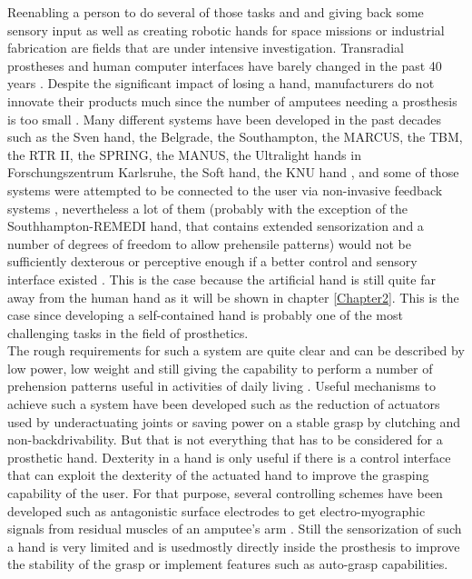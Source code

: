 \documentclass[main]{subfiles}
\begin{document}
Reenabling a person to do several of those tasks and and giving back some sensory input as well as creating robotic hands for space missions or industrial fabrication are fields that are under intensive investigation. Transradial prostheses and human computer interfaces have barely changed in the past 40 years \cite{TheSmartHand2011}. Despite the significant impact of losing a hand, manufacturers do not innovate their products much since the number of amputees needing a prosthesis is too small \cite{DillinghamRecentTrends2002}. Many different systems have been developed in the past decades such as the Sven hand, the Belgrade, the Southampton, the MARCUS, the TBM, the RTR II, the SPRING,
the MANUS, the Ultralight hands in Forschungszentrum Karlsruhe, the Soft hand, the KNU hand \cite{Razic1972,Herberts1973,Light2000,Kyberd1995,Dechev2001,Massa2002,Carrozza2004,Pons2004,Pylatiuk2004,Carrozza2005,Chu2008}, and some of those systems were attempted to be connected to the user via non-invasive feedback systems \cite{Kyberd1993,Pons2005,Pylatiuk2004}, nevertheless a lot of them (probably with the exception of the Southhampton-REMEDI hand, that contains extended sensorization and a number of degrees of freedom to allow prehensile patterns) would not be sufficiently dexterous or perceptive enough if a better control and sensory interface existed \cite{Cipriani2010}. This is the case because the artificial hand is still quite far away from the human hand as it will be shown in chapter \ref{Chapter2}. This is the case since developing a self-contained hand is probably one of the most challenging tasks in the field of prosthetics.\\ The rough requirements for such a system are quite clear and can be described by low power, low weight and still giving the capability to perform a number of prehension patterns useful in activities of daily living \cite{TheSmartHand2011}. Useful mechanisms to achieve such a system have been developed such as the reduction of actuators used by underactuating joints or saving power on a stable grasp by clutching and non-backdrivability. But that is not everything that has to be considered for a prosthetic hand. Dexterity in a hand is only useful if there is a control interface that can exploit the dexterity of the actuated hand to improve the grasping capability of the user. For that purpose, several controlling schemes have been developed such as antagonistic surface electrodes to get electro-myographic signals from residual muscles of an amputee's arm \cite{Nightingale1985}. Still the sensorization of such a hand is very limited and is usedmostly directly inside the prosthesis to improve the stability of the grasp or implement features such as auto-grasp capabilities.\\
\end{document}
